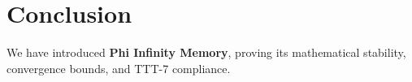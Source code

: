 \section{Conclusion}
We have introduced \textbf{Phi Infinity Memory}, proving its mathematical stability, convergence bounds, and TTT-7 compliance.